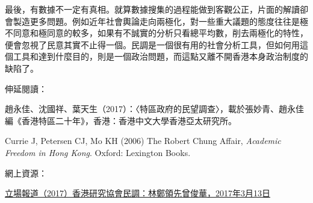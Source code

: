 最後，有數據不一定有真相。就算數據搜集的過程能做到客觀公正，片面的解讀卻會製造更多問題。例如近年社會輿論走向兩極化，對一些重大議題的態度往往是極不同意和極同意的較多，如果有不誠實的分析只看總平均數，削去兩極化的特性，便會忽視了民意其實不止得一個。民調是一個很有用的社會分析工具，但如何用這個工具和達到什麼目的，則是一個政治問題，而這點又離不開香港本身政治制度的缺陷了。



伸延閱讀：

趙永佳、沈國祥、葉天生（2017）：〈特區政府的民望調查〉，載於張妙青、趙永佳編《香港特區二十年》，香港：香港中文大學香港亞太研究所。

Currie J, Petersen CJ, Mo KH (2006) The Robert Chung Affair, \textit{Academic Freedom in Hong Kong}. Oxford: Lexington Books.

網上資源：

\href{https://thestandnews.com/politics/平行時空-香港研究協會民調-林鄭領先曾俊華/}{立場報道（2017）香港研究協會民調：林鄭領先曾俊華，2017年3月13日}